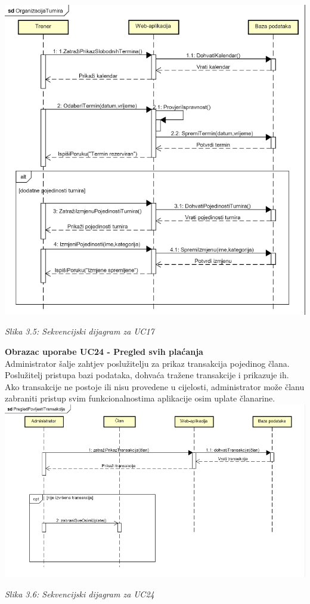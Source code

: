 \documentclass{article}
\begin{document}
		\eject
		\includegraphics[width=\columnwidth]{organizacija_turnira}
		\begin{center}
			\textit{Slika 3.5: Sekvencijski dijagram za UC17}
		\end{center}
		\eject
		\textbf{Obrazac uporabe UC24 - Pregled svih plaćanja}\\
		Administrator šalje zahtjev poslužitelju za prikaz transakcija pojedinog člana. Poslužitelj pristupa bazi podataka, dohvaća tražene transakcije i prikazuje ih. Ako transakcije ne postoje ili nisu provedene u cijelosti, administrator može članu zabraniti pristup svim funkcionalnostima aplikacije osim uplate članarine.
		\eject
		\includegraphics[width=\columnwidth]{prikaz_transakcija}
		\begin{center}
			\textit{Slika 3.6: Sekvencijski dijagram za UC24}
		\end{center}
		\eject
\end{document}
